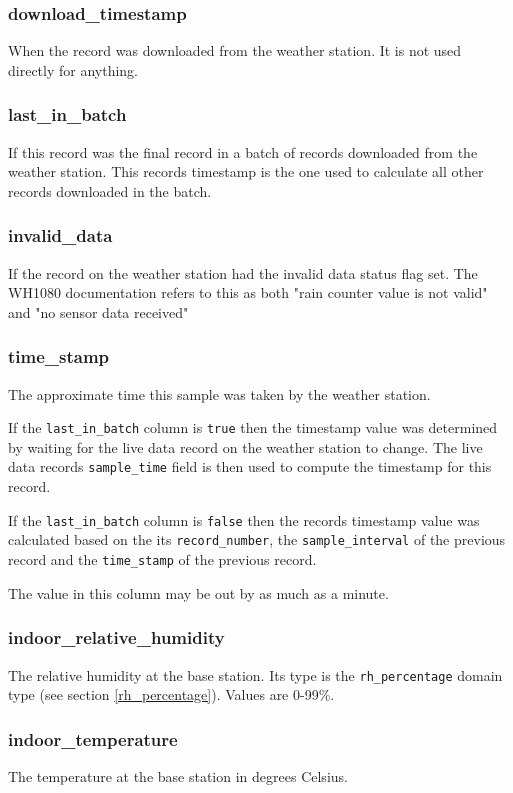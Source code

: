 \documentclass[a4paper,10pt]{book}
\begin{document}
\subsubsection{download\_timestamp}
When the record was downloaded from the weather station. It is not used directly for anything.

\subsubsection{last\_in\_batch}
If this record was the final record in a batch of records downloaded from the weather station. This records timestamp is the one used to calculate all other records downloaded in the batch.

\subsubsection{invalid\_data}
If the record on the weather station had the invalid data status flag set. The WH1080 documentation refers to this as both "rain counter value is not valid" and "no sensor data received"

\subsubsection{time\_stamp}
The approximate time this sample was taken by the weather station. 

If the \verb|last_in_batch| column is \verb|true| then the timestamp value was determined by waiting for the live data record on the weather station to change. The live data records \verb|sample_time| field is then used to compute the timestamp for this record.

If the \verb|last_in_batch| column is \verb|false| then the records timestamp value was calculated based on the its \verb|record_number|, the \verb|sample_interval| of the previous record and the \verb|time_stamp| of the previous record.

The value in this column may be out by as much as a minute.

\subsubsection{indoor\_relative\_humidity}
The relative humidity at the base station. Its type is the \verb|rh_percentage| domain type (see section \ref{rh_percentage}). Values are 0-99\%.

\subsubsection{indoor\_temperature}
The temperature at the base station in degrees Celsius. 
\end{document}
